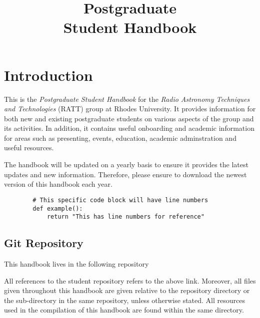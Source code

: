 \documentclass[12pt]{article}
\title{Postgraduate\\Student Handbook}
\author{}  %
\date{\the\year}
\begin{document}
\maketitle

\newpage

\tableofcontents

\newpage

\section{Introduction}

    This is the \emph{Postgraduate Student Handbook} for the \emph{Radio Astronomy Techniques and Technologies} (RATT) group at Rhodes University. It provides information for both new and existing postgraduate students on various aspects of the group and its activities. In addition, it contains useful onboarding and academic information for areas such as presenting, events, education, academic adminstration and useful resources.

    The handbook will be updated on a yearly basis to ensure it provides the latest updates and new information. Therefore, please ensure to download the newest version of this handbook each year.


    \begin{verbatim}
        # This specific code block will have line numbers
        def example():
            return "This has line numbers for reference"
    \end{verbatim}

    \subsection{Git Repository}\label{subsec:git_repository}
        This handbook lives in the following repository

        \begin{quotation}
        \end{quotation}

        All references to the student repository refers to the above link. Moreover, all files given throughout this handbook are given relative to the repository directory  or the sub-directory  in the same repository, unless otherwise stated. All resources used in the compilation of this handbook are found within the same directory.
\end{document}
